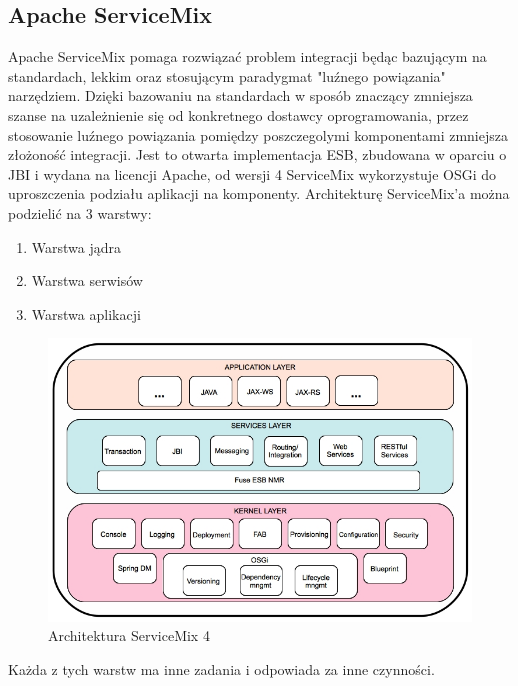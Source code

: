 \subsection{Apache ServiceMix}
Apache ServiceMix pomaga rozwiązać problem integracji będąc bazującym na standardach, lekkim oraz stosującym paradygmat "luźnego powiązania" narzędziem. Dzięki bazowaniu na standardach w sposób znaczący zmniejsza szanse na uzależnienie się od konkretnego dostawcy oprogramowania, przez stosowanie luźnego powiązania pomiędzy poszczegolymi komponentami zmniejsza złożoność integracji. Jest to otwarta implementacja ESB, zbudowana w oparciu o JBI i wydana na licencji Apache, od wersji 4 ServiceMix wykorzystuje OSGi do uproszczenia podziału aplikacji na komponenty. 	
Architekturę ServiceMix'a można podzielić na 3 warstwy:
\begin{enumerate}
	\item Warstwa jądra
	\item Warstwa serwisów
	\item Warstwa aplikacji
\end{enumerate}  
\begin{figure}[!h]
	\centering
	\includegraphics[scale=0.45]{ServiceMixArchitektura.jpg} 
	\caption{Architektura ServiceMix 4}
\end{figure}
Każda z tych warstw ma inne zadania i odpowiada za inne czynności.
